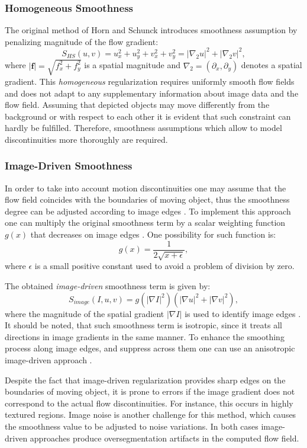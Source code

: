 \subsubsection{Homogeneous Smoothness}
\label{homogeneous_smoothness}

The original method of Horn and Schunck \cite{HornSchunck81} introduces smoothness assumption by penalizing magnitude of the flow gradient:
$$ S_{HS}(u,v) = u_{x}^2 + u_{y}^2 + v_{x}^2 + v_{y}^2 = |\nabla_2 u|^2 + |\nabla_2 v|^2,$$
where $|\textbf{f}| = \sqrt{f^2_x + f^2_y}$ is a spatial magnitude and $\nabla_2 = (\partial_{x}, \partial_{y})$ denotes a spatial gradient.
This \textit{homogeneous} regularization requires uniformly smooth flow fields and does not adapt to any supplementary information about image data and the flow field. Assuming that depicted objects may move differently from the background or with respect to each other it is evident that such constraint can hardly be fulfilled. Therefore, smoothness assumptions which allow to model discontinuities more thoroughly are required.

\subsubsection{Image-Driven Smoothness}
\label{image_driven}

In order to take into account motion discontinuities one may assume that the flow field coincides with the boundaries of moving object, thus the smoothness degree can be adjusted according to image edges  \cite{Nagel86, Alvarez99}. To implement this approach one can multiply the original smoothness term by a scalar weighting function $g(x)$ that decreases on image edges \cite{Schnorr93, Alvarez99}. One possibility for such function is:
$$ g(x) = \frac{1}{2 \sqrt{x + \epsilon}}, $$
where $\epsilon$ is a small positive constant used to avoid a problem of division by zero.

The obtained \textit{image-driven} smoothness term is given by:
$$ S_{image}(I,u,v) = g(|\nabla I|^2)(|\nabla u|^2 + |\nabla v|^2), $$
where the magnitude of the spatial gradient $|\nabla I|$ is used to identify image edges \cite{Weickert00b}. It should be noted, that such smoothness term is isotropic, since it treats all directions in image gradients in the same manner. To enhance the smoothing process along image edges, and suppress across them one can use an anisotropic image-driven approach \cite{Nagel86}. 

Despite the fact that image-driven regularization provides sharp edges on the boundaries of moving object, it is prone to errors if the image gradient does not correspond to the actual flow discontinuities. For instance, this occurs in highly textured regions. Image noise is another challenge for this method, which causes the smoothness value to be adjusted to noise variations. In both cases image-driven approaches produce oversegmentation artifacts in the computed flow field. 

